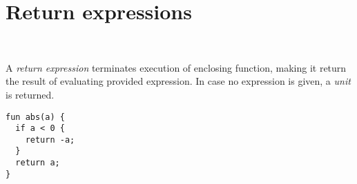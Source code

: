 \section{Return expressions}

\begin{bnf}
   \eq {} \ 
\end{bnf}

A \emph{return expression} terminates execution of enclosing function, making it return the result of evaluating provided expression. In case no expression is given, a \emph{unit} is returned.

\begin{example}
\begin{lstlisting}
fun abs(a) {
  if a < 0 {
    return -a;
  }
  return a;
}
\end{lstlisting}
\end{example}
